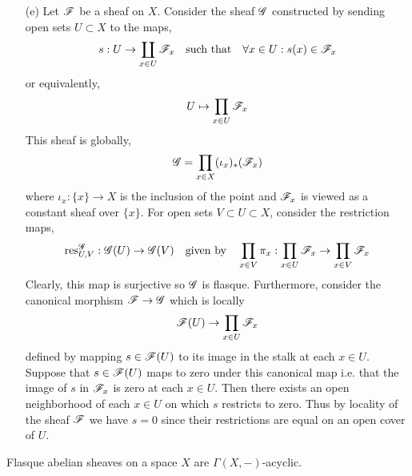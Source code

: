 \documentclass[12pt]{article}
\begin{document}
\begin{enumerate}
\item[(e)] Let $\mathscr{F}$ be a sheaf on $X$. Consider the sheaf $\mathscr{G}$ constructed by sending open sets $U \subset X$ to the maps,
\[ s : U \to \coprod_{x \in U} \mathscr{F}_x \quad \text{such that} \quad \forall x \in U : s(x) \in \mathscr{F}_x \]
or equivalently,
\[ U \mapsto \prod_{x \in U} \mathscr{F}_x \]
This sheaf is globally,
\[ \mathscr{G} = \prod_{x \in X} (\iota_x)_*(\mathscr{F}_x) \]
where $\iota_x : \{x\} \to X$ is the inclusion of the point and $\mathscr{F}_x$ is viewed as a constant sheaf over $\{ x \}$. For open sets $V \subset U \subset X$, consider the restriction maps,
\[ \mathrm{res}^{\mathscr{G}}_{U, V} : \mathscr{G}(U) \to \mathscr{G}(V) \quad \text{given by} \quad \prod_{x \in V} \pi_x : \prod_{x \in U} \mathscr{F}_x \to \prod_{x \in V} \mathscr{F}_x \]
Clearly, this map is surjective so $\mathscr{G}$ is flasque. Furthermore, consider the canonical morphism $\mathscr{F} \to \mathscr{G}$ which is locally
\[ \mathscr{F}(U) \to \prod_{x \in U} \mathscr{F}_x \]
defined by mapping $s \in \mathscr{F}(U)$ to its image in the stalk at each $x \in U$. Suppose that $s \in \mathscr{F}(U)$ maps to zero under this canonical map i.e. that the image of $s$ in $\mathscr{F}_x$ is zero at each $x \in U$. Then there exists an open neighborhood of each $x \in U$ on which $s$ restricts to zero. Thus by locality of the sheaf $\mathscr{F}$ we have $s = 0$ since their restrictions are equal on an open cover of $U$. 
\end{enumerate}

\begin{proposition}
Flasque abelian sheaves on a space $X$ are $\Gamma(X, -)$-acyclic.
\end{proposition}
\end{document}
